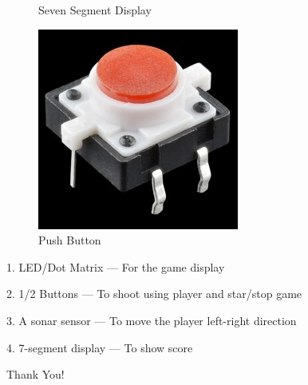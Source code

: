 \documentclass[15pt]{beamer}
\begin{document}
\begin{frame}
\begin{figure}
\begin{minipage}[b]{0.4\textwidth}
    \caption{Seven Segment Display}
  \end{minipage}
    \hfill
  \begin{minipage}[b]{0.4\textwidth}
    \includegraphics[width=.5\textwidth]{push_button.jpg}
    \caption{Push Button}
  \end{minipage}
\end{figure}

\end{frame}

\begin{frame}

1. LED/Dot Matrix --- For the game display

2. 1/2 Buttons --- To shoot using player and star/stop game

3. A sonar sensor --- To move the player left-right direction

4. 7-segment display --- To show score

\end{frame}


\begin{frame}%
\begin{center}
\Huge Thank You!
\end{center}
\end{frame}
\end{document}
